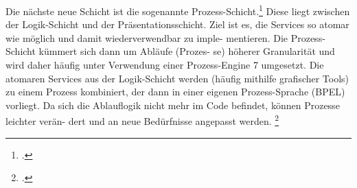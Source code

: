 \documentclass{bschlangaul-theorie}
\begin{document}
Die nächste neue Schicht ist die sogenannte
Prozess-Schicht.\footcite[Seite 17]{sosy:fs:4} Diese liegt zwischen der
Logik-Schicht und der Präsentationsschicht. Ziel ist es, die Services so
atomar wie möglich und damit wiederverwendbar zu imple- mentieren. Die
Prozess-Schicht kümmert sich dann um Abläufe (Prozes- se) höherer
Granularität und wird daher häufig unter Verwendung einer Prozess-Engine
7 umgesetzt. Die atomaren Services aus der Logik-Schicht werden (häufig
mithilfe grafischer Tools) zu einem Prozess kombiniert, der dann in
einer eigenen Prozess-Sprache (\zB BPEL) vorliegt. Da sich die
Ablauflogik nicht mehr im Code befindet, können Prozesse leichter verän-
dert und an neue Bedürfnisse angepasst werden.
\footcite[Seite 214-215]{schatten}

\literatur
\end{document}
